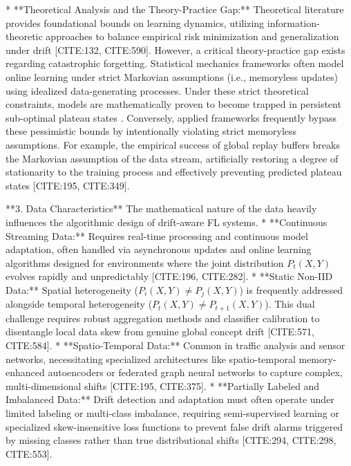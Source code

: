\documentclass[journal]{IEEEtran}
\begin{document}
*   **Theoretical Analysis and the Theory-Practice Gap:** Theoretical literature provides foundational bounds on learning dynamics, utilizing information-theoretic approaches to balance empirical risk minimization and generalization under drift [CITE:132, CITE:590]. However, a critical theory-practice gap exists regarding catastrophic forgetting. Statistical mechanics frameworks often model online learning under strict Markovian assumptions (i.e., memoryless updates) using idealized data-generating processes. Under these strict theoretical constraints, models are mathematically proven to become trapped in persistent sub-optimal plateau states \cite{Straat2018}. Conversely, applied frameworks frequently bypass these pessimistic bounds by intentionally violating strict memoryless assumptions. For example, the empirical success of global replay buffers breaks the Markovian assumption of the data stream, artificially restoring a degree of stationarity to the training process and effectively preventing predicted plateau states [CITE:195, CITE:349].

**3. Data Characteristics**
The mathematical nature of the data heavily influences the algorithmic design of drift-aware FL systems.
*   **Continuous Streaming Data:** Requires real-time processing and continuous model adaptation, often handled via asynchronous updates and online learning algorithms designed for environments where the joint distribution $P_t(X, Y)$ evolves rapidly and unpredictably [CITE:196, CITE:282].
*   **Static Non-IID Data:** Spatial heterogeneity ($P_i(X, Y) \neq P_j(X, Y)$) is frequently addressed alongside temporal heterogeneity ($P_t(X, Y) \neq P_{t+1}(X, Y)$). This dual challenge requires robust aggregation methods and classifier calibration to disentangle local data skew from genuine global concept drift [CITE:571, CITE:584].
*   **Spatio-Temporal Data:** Common in traffic analysis and sensor networks, necessitating specialized architectures like spatio-temporal memory-enhanced autoencoders or federated graph neural networks to capture complex, multi-dimensional shifts [CITE:195, CITE:375].
*   **Partially Labeled and Imbalanced Data:** Drift detection and adaptation must often operate under limited labeling or multi-class imbalance, requiring semi-supervised learning or specialized skew-insensitive loss functions to prevent false drift alarms triggered by missing classes rather than true distributional shifts [CITE:294, CITE:298, CITE:553].
\end{document}

